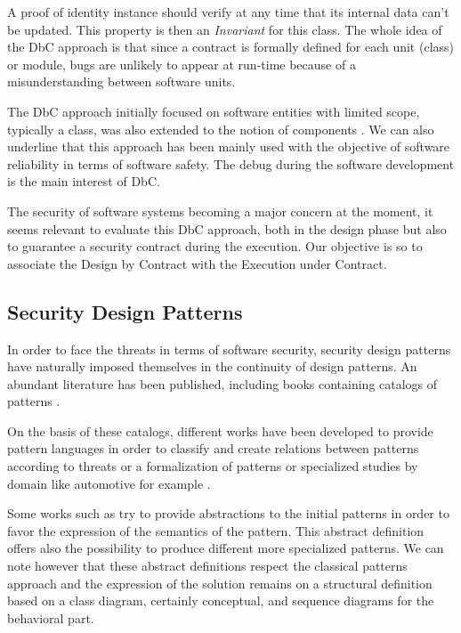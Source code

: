 A proof of identity instance should verify at any time that its internal data can't be updated. This property is then an \textit{Invariant} for this class.
The whole idea of the DbC approach is that since a contract is formally defined for each unit (class) or module, bugs are unlikely to appear at run-time because of a misunderstanding between software units.



The DbC approach initially focused on software entities with limited scope, typically a class, was also extended to the notion of components \cite{beugnard1999,beugnard2010contract}.
We can also underline that this approach has been mainly used with the objective of software reliability in terms of software safety. 
The debug during the software development is the main interest of DbC. 

The security of software systems becoming a major concern at the moment, it seems relevant to evaluate this DbC approach, both in the design phase but also to guarantee a security contract during the execution.
Our objective is so to associate the Design by Contract with the Execution under Contract.

\subsection{Security Design Patterns}

In order to face the threats in terms of software security, security design patterns have naturally imposed themselves in the continuity of design patterns.
An abundant literature has been published, including books containing catalogs of patterns \cite{fernandezBooks}.

On the basis of these catalogs, different works have been developed to provide pattern languages in order to classify and create relations between patterns according to threats \cite{fernandez2013} or a formalization of patterns \cite{behrens2018} or specialized studies by domain like automotive for example \cite{cheng2019}.

Some works such as \cite{fernandez2018abstract} try to provide abstractions to the initial patterns in order to favor the expression of the semantics of the pattern. This abstract definition offers also the possibility to produce different more specialized patterns.  
We can note however that these abstract definitions respect the classical patterns approach and the expression of the solution remains on a structural definition based on a class diagram, certainly conceptual, and sequence diagrams for the behavioral part.

